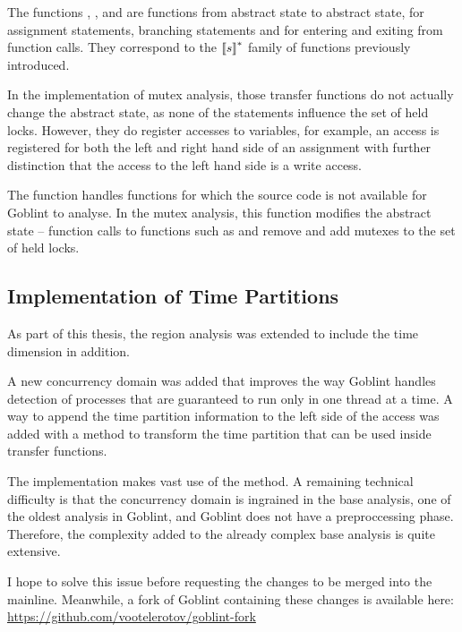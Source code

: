 \documentclass[..thesis.tex]{subfiles}
\begin{document}
The functions , ,  and  are functions from abstract state to abstract state, for assignment statements,
branching statements and for entering and exiting from function calls. They correspond to the $\left\llbracket s \right\rrbracket^{*}$ family of functions previously introduced.

In the implementation of mutex analysis, those transfer functions do not actually change the abstract state, as none of the statements influence the set of held locks.
However, they do register accesses to variables, for example, an access is registered for both the left and right hand side of an assignment with further distinction
that the access to the left hand side is a write access.

The  function handles functions for which the source code is not available for Goblint to analyse. In the mutex analysis,
this function modifies the abstract state -- function calls to functions such as  and  
remove and add mutexes to the set of held locks.


\subsection{Implementation of Time Partitions}

As part of this thesis, the region analysis was extended to include the time dimension in addition.

A new concurrency domain was added that improves the way Goblint handles detection of processes that are guaranteed to run only in one thread at a time.
A way to append the time partition information to the left side of the access was added with a method to transform the time partition that can be used inside transfer functions. 

The implementation makes vast use of the  method. A remaining technical difficulty is that the concurrency domain is ingrained in the base analysis,
one of the oldest analysis in Goblint, and Goblint does not have a preproccessing phase. Therefore, the complexity added to the already complex base analysis is quite extensive.

I hope to solve this issue before requesting the changes to be merged into the mainline.
Meanwhile, a fork of Goblint containing these changes is available here: \url{https://github.com/vootelerotov/goblint-fork}
\end{document}
